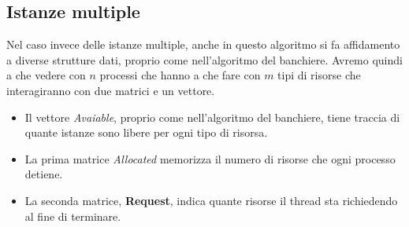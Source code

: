 \subsection{Istanze multiple}
Nel caso invece delle istanze multiple, anche in questo algoritmo si fa affidamento a diverse strutture dati, proprio come nell'algoritmo del banchiere. Avremo quindi a che vedere con $n$ processi che hanno a che fare con $m$ tipi di risorse che interagiranno con due matrici e un vettore.
\vspace{-5px}
\begin{itemize}
\setlength{\itemsep}{-.15 em}
    \item Il vettore \textit{Avaiable}, proprio come nell'algoritmo del banchiere, tiene traccia di quante istanze sono libere per ogni tipo di risorsa.
    \item La prima matrice \textit{Allocated} memorizza il numero di risorse che ogni processo detiene.
    \item La seconda matrice, \textbf{Request}, indica quante risorse il thread sta richiedendo al fine di terminare.
\end{itemize}

